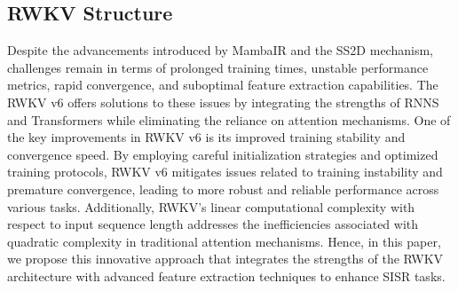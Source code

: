 
\subsection{RWKV Structure}

Despite the advancements introduced by MambaIR \cite{mambair} and the SS2D \cite{vision-mamba} mechanism, challenges remain in terms of prolonged training times, unstable performance metrics, rapid convergence, and suboptimal feature extraction capabilities. The RWKV v6\cite{rwkv} offers solutions to these issues by integrating the strengths of RNNS and Transformers while eliminating the reliance on attention mechanisms. One of the key improvements in RWKV v6 is its improved training stability and convergence speed. By employing careful initialization strategies and optimized training protocols, RWKV v6 mitigates issues related to training instability and premature convergence, leading to more robust and reliable performance across various tasks. Additionally, RWKV's linear computational complexity with respect to input sequence length addresses the inefficiencies associated with quadratic complexity in traditional attention mechanisms. Hence, in this paper, we propose this innovative approach that integrates the strengths of the RWKV architecture with advanced feature extraction techniques to enhance SISR tasks.